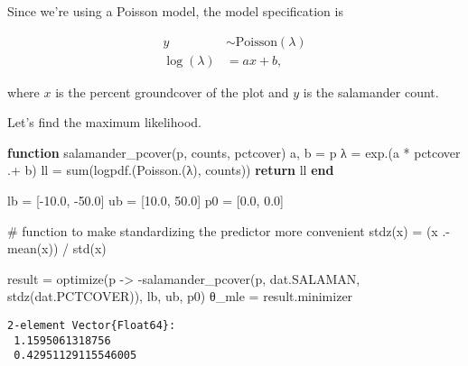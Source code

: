 \documentclass[
  letterpaper,
  DIV=11,
  numbers=noendperiod]{scrartcl}
\newenvironment{Shaded}{\begin{snugshade}}{\end{snugshade}}
\newcommand{\CommentTok}[1]{\textcolor[rgb]{0.37,0.37,0.37}{#1}}
\newcommand{\ControlFlowTok}[1]{\textcolor[rgb]{0.00,0.23,0.31}{\textbf{#1}}}
\newcommand{\FloatTok}[1]{\textcolor[rgb]{0.68,0.00,0.00}{#1}}
\newcommand{\FunctionTok}[1]{\textcolor[rgb]{0.28,0.35,0.67}{#1}}
\newcommand{\KeywordTok}[1]{\textcolor[rgb]{0.00,0.23,0.31}{\textbf{#1}}}
\newcommand{\NormalTok}[1]{\textcolor[rgb]{0.00,0.23,0.31}{#1}}
\newcommand{\OperatorTok}[1]{\textcolor[rgb]{0.37,0.37,0.37}{#1}}
\begin{document}
Since we're using a Poisson model, the model specification is

\begin{equation*}
\begin{aligned}
y &\sim \text{Poisson}(\lambda) \\
\log(\lambda) &= a x + b,
\end{aligned}
\end{equation*}

where \(x\) is the percent groundcover of the plot and \(y\) is the
salamander count.

Let's find the maximum likelihood.

\begin{Shaded}
\begin{Highlighting}[]
\KeywordTok{function} \FunctionTok{salamander\_pcover}\NormalTok{(p, counts, pctcover) }
\NormalTok{    a, b }\OperatorTok{=}\NormalTok{ p}
\NormalTok{    λ }\OperatorTok{=} \FunctionTok{exp}\NormalTok{.(a }\OperatorTok{*}\NormalTok{ pctcover }\OperatorTok{.+}\NormalTok{ b)}
\NormalTok{    ll }\OperatorTok{=} \FunctionTok{sum}\NormalTok{(}\FunctionTok{logpdf}\NormalTok{.(}\FunctionTok{Poisson}\NormalTok{.(λ), counts))}
    \ControlFlowTok{return}\NormalTok{ ll}
\KeywordTok{end}

\NormalTok{lb }\OperatorTok{=}\NormalTok{ [}\OperatorTok{{-}}\FloatTok{10.0}\NormalTok{, }\OperatorTok{{-}}\FloatTok{50.0}\NormalTok{]}
\NormalTok{ub }\OperatorTok{=}\NormalTok{ [}\FloatTok{10.0}\NormalTok{, }\FloatTok{50.0}\NormalTok{]}
\NormalTok{p0 }\OperatorTok{=}\NormalTok{ [}\FloatTok{0.0}\NormalTok{, }\FloatTok{0.0}\NormalTok{]}

\CommentTok{\# function to make standardizing the predictor more convenient}
\FunctionTok{stdz}\NormalTok{(x) }\OperatorTok{=}\NormalTok{ (x }\OperatorTok{.{-}} \FunctionTok{mean}\NormalTok{(x)) }\OperatorTok{/} \FunctionTok{std}\NormalTok{(x)}

\NormalTok{result }\OperatorTok{=} \FunctionTok{optimize}\NormalTok{(p }\OperatorTok{{-}\textgreater{}} \FunctionTok{{-}salamander\_pcover}\NormalTok{(p, dat.SALAMAN, }\FunctionTok{stdz}\NormalTok{(dat.PCTCOVER)), lb, ub, p0)}
\NormalTok{θ\_mle }\OperatorTok{=}\NormalTok{ result.minimizer}
\end{Highlighting}
\end{Shaded}

\begin{verbatim}
2-element Vector{Float64}:
 1.1595061318756
 0.42951129115546005
\end{verbatim}
\end{document}
